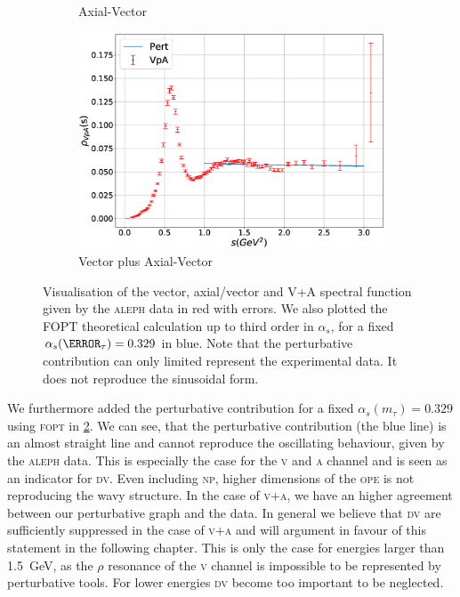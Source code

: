 \documentclass[../../index.tex]{subfiles}
\begin{document}
\begin{figure}
\begin{subfigure}[b]{0.49\textwidth}
    \caption{Axial-Vector}
    \label{fig:alephA}
  \end{subfigure}
  \begin{subfigure}[b]{\textwidth}
    \centering
    \includegraphics[width=\textwidth]{./images/specFuncAleph_VpA.eps}
    \caption{Vector plus Axial-Vector}
    \label{fig:alephVPlusA}
  \end{subfigure}
  \caption{Visualisation of the vector, axial\-/vector and V+A spectral function
    given by the \textsc{aleph} data \cite{Davier2013} in red with errors. We
    also plotted the \textsc{FOPT} theoretical calculation up to third order in
    \(\alpha_s\), for a fixed \(\alpha_s(\m_\tau)=0.329\) in blue. Note that the
    perturbative contribution can only limited represent the experimental data.
    It does not reproduce the sinusoidal form.}
  \label{fig:aleph}
\end{figure}

We furthermore added the perturbative contribution for a fixed
\(\alpha_s(m_\tau)=0.329\) using \textsc{fopt} in \cref{fig:alephVPlusA}. We can
see, that the perturbative contribution (the blue line) is an almost straight
line and cannot reproduce the oscillating behaviour, given by the \textsc{aleph}
data. This is especially the case for the \textsc{v} and \textsc{a} channel and
is seen as an indicator for \textsc{dv}. Even including \textsc{np}, higher
dimensions of the \textsc{ope} is not reproducing the wavy structure. In the
case of \textsc{v+a}, we have an higher agreement between our perturbative graph
and the data. In general we believe that \textsc{dv} are sufficiently suppressed
in the case of \textsc{v+a} and will argument in favour of this statement in the
following chapter. This is only the case for energies larger than
\SI{1.5}{\giga\eV}, as the \(\rho\) resonance of the \textsc{v} channel is
impossible to be represented by perturbative tools. For lower energies
\textsc{dv} become too important to be neglected.
\end{document}
